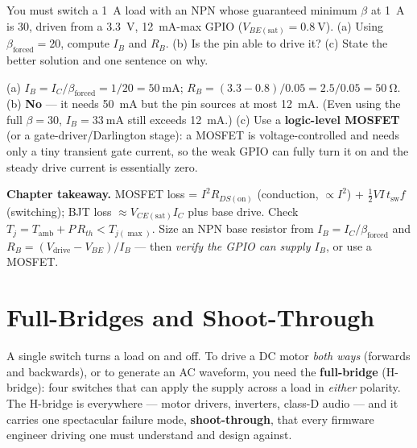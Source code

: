 \documentclass[11pt,a4paper,oneside]{book}
\begin{document}
\begin{exercise}
You must switch a \qty{1}{\ampere} load with an NPN whose guaranteed minimum
$\beta$ at \qty{1}{\ampere} is 30, driven from a \qty{3.3}{\volt},
\qty{12}{\milli\ampere}-max GPIO ($V_{BE(\text{sat})}=\qty{0.8}{\volt}$).
(a) Using $\beta_{\text{forced}}=20$, compute $I_B$ and $R_B$. (b) Is the pin
able to drive it? (c) State the better solution and one sentence on why.
\end{exercise}
\begin{solution}
(a) $I_B = I_C/\beta_{\text{forced}} = 1/20 = \qty{50}{\milli\ampere}$;
$R_B = (3.3-0.8)/0.05 = 2.5/0.05 = \qty{50}{\ohm}$.
(b) \textbf{No} --- it needs \qty{50}{\milli\ampere} but the pin sources at most
\qty{12}{\milli\ampere}. (Even using the full $\beta=30$, $I_B=\qty{33}{\milli\ampere}$
still exceeds \qty{12}{\milli\ampere}.) (c) Use a \textbf{logic-level
MOSFET} (or a gate-driver/Darlington stage): a MOSFET is voltage-controlled and
needs only a tiny transient gate current, so the weak GPIO can fully turn it on
and the steady drive current is essentially zero.
\end{solution}

\begin{keyidea}
\textbf{Chapter takeaway.} MOSFET loss = $I^2R_{DS(\text{on})}$ (conduction,
$\propto I^2$) + $\tfrac12 VI\,t_{\text{sw}}f$ (switching); BJT loss
$\approx V_{CE(\text{sat})}I_C$ plus base drive. Check $T_j = T_{\text{amb}} +
P\,R_{th}<T_{j(\max)}$. Size an NPN base resistor from
$I_B=I_C/\beta_{\text{forced}}$ and $R_B=(V_{\text{drive}}-V_{BE})/I_B$ --- then
\emph{verify the GPIO can supply $I_B$}, or use a MOSFET.
\end{keyidea}

\chapter{Full-Bridges and Shoot-Through}
\label{ch:fullbridge}

A single switch turns a load on and off. To drive a DC motor \emph{both ways}
(forwards and backwards), or to generate an AC waveform, you need the
\textbf{full-bridge} (H-bridge): four switches that can apply the supply across a
load in \emph{either} polarity. The H-bridge is everywhere --- motor drivers,
inverters, class-D audio --- and it carries one spectacular failure mode,
\textbf{shoot-through}, that every firmware engineer driving one must understand
and design against.
\end{document}
